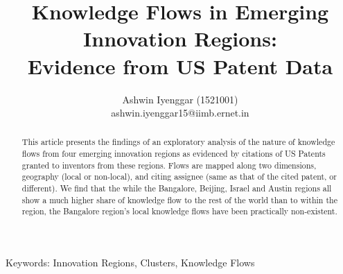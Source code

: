 \documentclass[12pt]{article}
\begin{document}
\title{Knowledge Flows in Emerging Innovation Regions:\\  Evidence from US Patent Data}
\author{Ashwin Iyenggar  (1521001) \\ ashwin.iyenggar15@iimb.ernet.in} 


\maketitle
\thispagestyle{empty}

\begin{abstract}
This article presents the findings of an exploratory analysis of the nature of knowledge flows from four emerging innovation regions as evidenced by citations of US Patents granted to inventors from these regions. Flows are mapped along two dimensions, geography (local or non-local), and citing assignee (same as that of the cited patent, or different). We find that the while the Bangalore, Beijing, Israel and Austin regions all show a much higher share of knowledge flow to the rest of the world than to within the region, the Bangalore region's local knowledge flows have been practically non-existent.
\end{abstract}


{Keywords:} Innovation Regions, Clusters, Knowledge Flows
\end{document}
